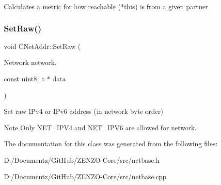 Calculates a metric for how reachable ($\ast$this) is from a given partner \mbox{\label{class_c_net_addr_a1f0b23aca4ca78c11735d13f3583b7ad}} 
\subsubsection{\texorpdfstring{SetRaw()}{SetRaw()}}
{\footnotesize\ttfamily void C\+Net\+Addr\+::\+Set\+Raw (\begin{DoxyParamCaption}\item[{Network}]{network,  }\item[{const uint8\+\_\+t $\ast$}]{data }\end{DoxyParamCaption})}

Set raw I\+Pv4 or I\+Pv6 address (in network byte order) \begin{DoxyNote}{Note}
Only N\+E\+T\+\_\+\+I\+P\+V4 and N\+E\+T\+\_\+\+I\+P\+V6 are allowed for network. 
\end{DoxyNote}


The documentation for this class was generated from the following files\+:\begin{DoxyCompactItemize}
\item 
D\+:/\+Documentz/\+Git\+Hub/\+Z\+E\+N\+Z\+O-\/\+Core/src/netbase.\+h\item 
D\+:/\+Documentz/\+Git\+Hub/\+Z\+E\+N\+Z\+O-\/\+Core/src/netbase.\+cpp\end{DoxyCompactItemize}
